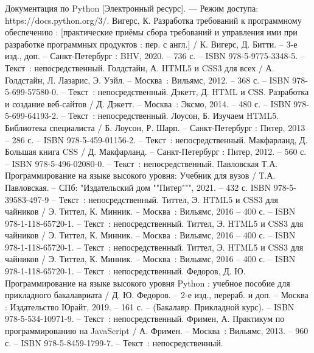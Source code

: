 
\begin{thebibliography}{9}

     Документация по Python [Электронный ресурс]. — Режим доступа: https://docs.python.org/3/.
     Вигерс, К. Разработка требований к программному обеспечению : [практические приёмы сбора требований и управления ими при разработке программных продуктов : пер. с англ.] / К. Вигерс, Д. Битти. – 3-е изд., доп. – Санкт-Петербург : BHV, 2020. – 736 с. – ISBN 978-5-9775-3348-5. – Текст~: непосредственный.
		Голдстайн, А. HTML5 и CSS3 для всех / А. Голдстайн, Л. Лазарис, Э. Уэйл. – Москва~: Вильямс, 2012. – 368 с. – ISBN 978-5-699-57580-0. – Текст~: непосредственный.
	 Дэкетт, Д. HTML и CSS. Разработка и создание веб-сайтов / Д. Дэкетт. – Москва~: Эксмо, 2014. – 480 с. – ISBN 978-5-699-64193-2. – Текст~: непосредственный.
	 Лоусон, Б. Изучаем HTML5. Библиотека специалиста / Б. Лоусон, Р. Шарп. – Санкт-Петербург : Питер, 2013 – 286 с. – ISBN 978-5-459-01156-2. – Текст~: непосредственный.
	 Макфарланд, Д. Большая книга CSS / Д. Макфарланд. – Санкт-Петербург : Питер, 2012. – 560 с. – ISBN 978-5-496-02080-0. – Текст~: непосредственный.
	 Павловская Т.А. Программирование на языке высокого уровня: Учебник для вузов / Т.А. Павловская. – СПб: "Издательский дом ""Питер""", 2021. – 432 с. ISBN 978-5-39583-497-9 – Текст~: непосредственный.  
	 Титтел, Э. HTML5 и CSS3 для чайников / Э. Титтел, К. Минник. – Москва~: Вильямс, 2016 – 400 с. – ISBN 978-1-118-65720-1. – Текст~: непосредственный.    
	 Титтел, Э. HTML5 и CSS3 для чайников / Э. Титтел, К. Минник. – Москва~: Вильямс, 2016 – 400 с. – ISBN 978-1-118-65720-1. – Текст~: непосредственный.        
		Титтел, Э. HTML5 и CSS3 для чайников / Э. Титтел, К. Минник. – Москва~: Вильямс, 2016 – 400 с. – ISBN 978-1-118-65720-1. – Текст~: непосредственный.
		Федоров, Д. Ю.  Программирование на языке высокого уровня Python : учебное пособие для прикладного бакалавриата / Д. Ю. Федоров. – 2-е изд., перераб. и доп. – Москва : Издательство Юрайт, 2019. – 161 с. – (Бакалавр. Прикладной курс). – ISBN 978-5-534-10971-9.  – Текст~: непосредственный.
	 Фримен, А. Практикум по программированию на JavaScript / А. Фримен. – Москва~: Вильямс, 2013. – 960 с. – ISBN 978-5-8459-1799-7. – Текст~: непосредственный.
\end{thebibliography}
